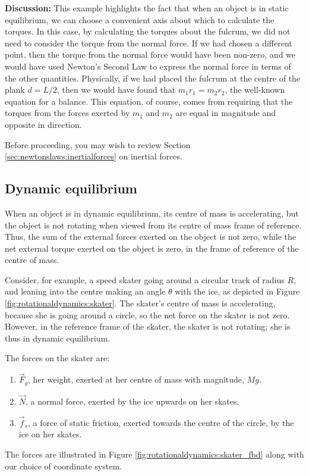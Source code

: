 \begin{example}
\textbf{Discussion: }This example highlights the fact that when an object is in static equilibrium, we can choose a convenient axis about which to calculate the torques. In this case, by calculating the torques about the fulcrum, we did not need to consider the torque from the normal force. If we had chosen a different point, then the torque from the normal force would have been non-zero, and we would have used Newton's Second Law to express the normal force in terms of the other quantities. Physically, if we had placed the fulcrum at the centre of the plank $d = L/2$, then we would have found that $m_1r_1 = m_2r_2$, the well-known equation for a balance. This equation, of course, comes from requiring that the torques from the forces exerted by $m_1$ and $m_2$ are equal in magnitude and opposite in direction.
\end{example}
\begin{review}
Before proceeding, you may wish to review Section \ref{sec:newtonslaws:inertialforces} on inertial forces.
\end{review}
\subsection{Dynamic equilibrium}
When an object is in dynamic equilibrium, its centre of mass is accelerating, but the object is not rotating when viewed from its centre of mass frame of reference. Thus, the sum of the external forces exerted on the object is not zero, while the net external torque exerted on the object is zero, in the frame of reference of the centre of mass.

Consider, for example, a speed skater going around a circular track of radius $R$, and leaning into the centre making an angle $\theta$ with the ice, as depicted in Figure \ref{fig:rotationaldynamics:skater}. The skater's centre of mass is accelerating, because she is going around a circle, so the net force on the skater is not zero. However, in the reference frame of the skater, the skater is not rotating; she is thus in dynamic equilibrium.

The forces on the skater are:
\begin{enumerate}
\item $\vec F_g$, her weight, exerted at her centre of mass with magnitude, $Mg$.
\item $\vec N$, a normal force, exerted by the ice upwards on her skates.
\item $\vec f_s$, a force of static friction, exerted towards the centre of the circle, by the ice on her skates.
\end{enumerate}
The forces are illustrated in Figure \ref{fig:rotationaldynamics:skater_fbd} along with our choice of coordinate system.

